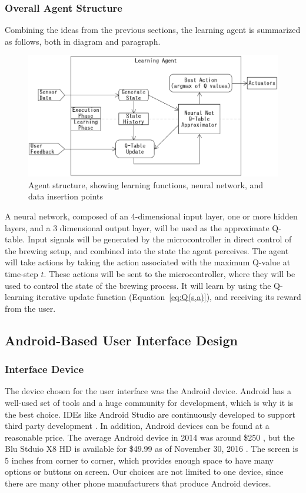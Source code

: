 \documentclass[draftclsnofoot,onecolumn,letterpaper,10pt]{IEEEtran}
\begin{document}
\subsubsection{Overall Agent Structure}
Combining the ideas from the previous sections, the learning agent is summarized as follows, both in diagram and paragraph.

\begin{figure}[h]
\begin{center}
	\caption{Agent structure, showing learning functions, neural network, and data insertion points \label{fig:AgentStructure}}
	\includegraphics[width=\linewidth]{totalagent.eps}
\end{center}
\end{figure}

A neural network, composed of an 4-dimensional input layer, one or more hidden layers, and a 3 dimensional output layer, will be used as the approximate Q-table.
Input signals will be generated by the microcontroller in direct control of the brewing setup, and combined into the state the agent perceives.
The agent will take actions by taking the action associated with the maximum Q-value at time-step $t$.
These actions will be sent to the microcontroller, where they will be used to control the state of the brewing process.
It will learn by using the Q-learning iterative update function (Equation~\ref{eq:Q(s,a)}), and receiving its reward from the user.


\subsection{Android-Based User Interface Design}\label{sec:android}%
\subsubsection{Interface Device}
The device chosen for the user interface was the Android device.
Android has a well-used set of tools and a huge community for development, which is why it is the best choice.
IDEs like Android Studio are continuously developed to support third party development \cite{AndroidStudio}.
In addition, Android devices can be found at a reasonable price.
The average Android device in 2014 was around \$250 \cite{AndroidStats}, but the Blu Stduio X8 HD is available for \$49.99 as of November 30, 2016 \cite{BluStudioX8}.
The screen is 5 inches from corner to corner, which provides enough space to have many options or buttons on screen.
Our choices are not limited to one device, since there are many other phone manufacturers that produce Android devices.
\end{document}
